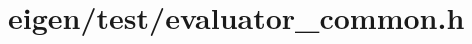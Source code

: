 \hypertarget{eigen_2test_2evaluator__common_8h_source}{}\section{eigen/test/evaluator\+\_\+common.h}
\label{eigen_2test_2evaluator__common_8h_source}

\begin{DoxyCode}
\end{DoxyCode}
